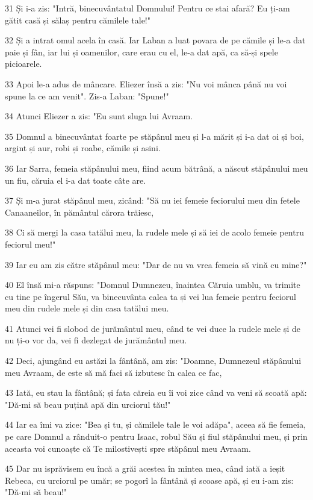 \par 31 Și i-a zis: "Intră, binecuvântatul Domnului! Pentru ce stai afară? Eu ți-am gătit casă și sălaș pentru cămilele tale!"
\par 32 Și a intrat omul acela în casă. Iar Laban a luat povara de pe cămile și le-a dat paie și fân, iar lui și oamenilor, care erau cu el, le-a dat apă, ca să-și spele picioarele.
\par 33 Apoi le-a adus de mâncare. Eliezer însă a zis: "Nu voi mânca până nu voi spune la ce am venit". Zis-a Laban: "Spune!"
\par 34 Atunci Eliezer a zis: "Eu sunt sluga lui Avraam.
\par 35 Domnul a binecuvântat foarte pe stăpânul meu și l-a mărit și i-a dat oi și boi, argint și aur, robi și roabe, cămile și asini.
\par 36 Iar Sarra, femeia stăpânului meu, fiind acum bătrână, a născut stăpânului meu un fiu, căruia el i-a dat toate câte are.
\par 37 Și m-a jurat stăpânul meu, zicând: "Să nu iei femeie feciorului meu din fetele Canaaneilor, în pământul cărora trăiesc,
\par 38 Ci să mergi la casa tatălui meu, la rudele mele și să iei de acolo femeie pentru feciorul meu!"
\par 39 Iar eu am zis către stăpânul meu: "Dar de nu va vrea femeia să vină cu mine?"
\par 40 El însă mi-a răspuns: "Domnul Dumnezeu, înaintea Căruia umblu, va trimite cu tine pe îngerul Său, va binecuvânta calea ta și vei lua femeie pentru feciorul meu din rudele mele și din casa tatălui meu.
\par 41 Atunci vei fi slobod de jurământul meu, când te vei duce la rudele mele și de nu ți-o vor da, vei fi dezlegat de jurământul meu.
\par 42 Deci, ajungând eu astăzi la fântână, am zis: "Doamne, Dumnezeul stăpânului meu Avraam, de este să mă faci să izbutesc în calea ce fac,
\par 43 Iată, eu stau la fântână; și fata căreia eu îi voi zice când va veni să scoată apă: "Dă-mi să beau puțină apă din urciorul tău!"
\par 44 Iar ea îmi va zice: "Bea și tu, și cămilele tale le voi adăpa", aceea să fie femeia, pe care Domnul a rânduit-o pentru Isaac, robul Său și fiul stăpânului meu, și prin aceasta voi cunoaște că Te milostivești spre stăpânul meu Avraam.
\par 45 Dar nu isprăvisem eu încă a grăi acestea în mintea mea, când iată a ieșit Rebeca, cu urciorul pe umăr; se pogorî la fântână și scoase apă, și eu i-am zis: "Dă-mi să beau!"
